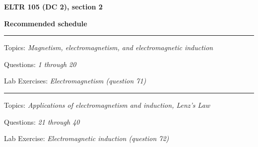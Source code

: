 \vskip 10pt








\vfil \eject

\centerline{\bf ELTR 105 (DC 2), section 2} \bigskip 
 
\vskip 10pt

\noindent
{\bf Recommended schedule}

\vskip 5pt

\hrule \vskip 5pt
\noindent
{}

\hskip 10pt Topics: {\it Magnetism, electromagnetism, and electromagnetic induction}
 
\hskip 10pt Questions: {\it 1 through 20}
 
\hskip 10pt Lab Exercises: {\it Electromagnetism (question 71)}
 






\vskip 10pt
\hrule \vskip 5pt
\noindent
{}

\hskip 10pt Topics: {\it Applications of electromagnetism and induction, Lenz's Law}
 
\hskip 10pt Questions: {\it 21 through 40}
 
\hskip 10pt Lab Exercise: {\it Electromagnetic induction (question 72)}
 



